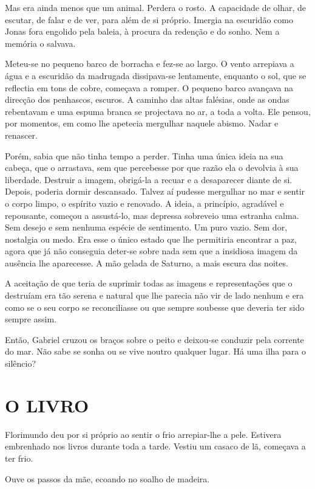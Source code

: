 Mas era ainda menos que um animal. Perdera o rosto. A capacidade de
olhar, de escutar, de falar e de ver, para além de si próprio. Imergia
na escuridão como Jonas fora engolido pela baleia, à procura da redenção
e do sonho. Nem a memória o salvava.

Meteu-se no pequeno barco de borracha e fez-se ao largo. O vento
arrepiava a água e a escuridão da madrugada dissipava-se lentamente,
enquanto o sol, que se reflectia em tons de cobre, começava a romper. O
pequeno barco avançava na direcção dos penhascos, escuros. A caminho das
altas falésias, onde as ondas rebentavam e uma espuma branca se
projectava no ar, a toda a volta. Ele pensou, por momentos, em como lhe
apetecia mergulhar naquele abismo. Nadar e renascer.

Porém, sabia que não tinha tempo a perder. Tinha uma única ideia na sua
cabeça, que o arrastava, sem que percebesse por que razão ela o devolvia
à sua liberdade. Destruir a imagem, obrigá-la a recuar e a desaparecer
diante de si. Depois, poderia dormir descansado. Talvez aí pudesse
mergulhar no mar e sentir o corpo limpo, o espírito vazio e renovado. A
ideia, a princípio, agradável e repousante, começou a assustá-lo, mas
depressa sobreveio uma estranha calma. Sem desejo e sem nenhuma espécie
de sentimento. Um puro vazio. Sem dor, nostalgia ou medo. Era esse o
único estado que lhe permitiria encontrar a paz, agora que já não
conseguia deter-se sobre nada sem que a insidiosa imagem da ausência lhe
aparecesse. A mão gelada de Saturno, a mais escura das noites.

A aceitação de que teria de suprimir todas as imagens e representações
que o destruíam era tão serena e natural que lhe parecia não vir de lado
nenhum e era como se o seu corpo se reconciliasse ou que sempre soubesse
que deveria ter sido sempre assim.

Então, Gabriel cruzou os braços sobre o peito e deixou-se conduzir pela
corrente do mar. Não sabe se sonha ou se vive noutro qualquer lugar. Há
uma ilha para o silêncio?

\section{O LIVRO}

Florimundo deu por si próprio ao sentir o frio arrepiar-lhe a pele.
Estivera embrenhado nos livros durante toda a tarde. Vestiu um casaco de
lã, começava a ter frio.

Ouve os passos da mãe, ecoando no soalho de madeira.

